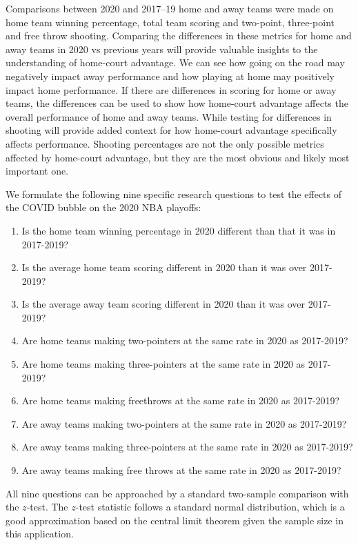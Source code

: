\documentclass[10pt]{article}
\begin{document}
Comparisons between 2020 and 2017--19 home and away teams were made on home team
winning percentage, total team scoring and two-point, three-point and free throw
shooting. Comparing the differences in these metrics for home and away teams in
2020 vs previous years will provide valuable insights to the understanding of
home-court advantage. We can see how going on the road may negatively impact
away performance and how playing at home may positively impact home performance.
If there are differences in scoring for home or away teams, the differences can
be used to show how home-court advantage affects the overall performance of home
and away teams. While testing for differences in shooting will provide added
context for how home-court advantage specifically affects performance.
Shooting percentages are not the only possible metrics affected by home-court
advantage, but they are the most obvious and likely most important one.

We formulate the following nine specific research questions to test
the effects of the COVID bubble on the 2020 NBA playoffs:

\begin{enumerate}
\def\labelenumi{\arabic{enumi}.}
\item
  Is the home team winning percentage in 2020 different than that it was in 2017-2019?
\item
  Is the average home team scoring different in 2020 than it was over 2017-2019?
\item
  Is the average away team scoring different in 2020 than it was over 2017-2019?
\item
  Are home teams making two-pointers at the same rate in 2020 as 2017-2019?
\item
  Are home teams making three-pointers at the same rate in 2020 as 2017-2019?
\item
  Are home teams making freethrows at the same rate in 2020 as 2017-2019?
\item
  Are away teams making two-pointers at the same rate in 2020 as 2017-2019?
\item
  Are away teams making three-pointers at the same rate in 2020 as 2017-2019?
\item
  Are away teams making free throws at the same rate in 2020 as 2017-2019?
\end{enumerate}

All nine questions can be approached by a standard two-sample
comparison with the \(z\)-test. The \(z\)-test statistic follows a
standard normal distribution, which is a good approximation based on
the central limit theorem given the sample size in this application.
\end{document}
